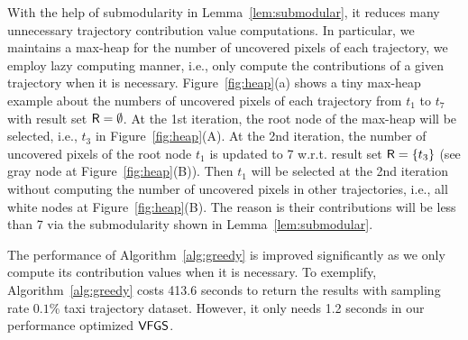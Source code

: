 With the help of submodularity in Lemma~\ref{lem:submodular}, it reduces many unnecessary trajectory contribution value computations.
In particular, we maintains a max-heap for the number of uncovered pixels of each trajectory,
we employ lazy computing manner, i.e., only compute the contributions of a given trajectory when it is necessary.
Figure~\ref{fig:heap}(a) shows a tiny max-heap example about the numbers of uncovered pixels of each trajectory from $t_1$ to $t_7$ with result set $\mathsf{R}=\emptyset$.
At the 1st iteration, the root node of the max-heap will be selected, i.e., $t_3$ in Figure~\ref{fig:heap}(A).
At the 2nd iteration, the number of uncovered pixels of the root node $t_1$ is updated to 7 w.r.t. result set $\mathsf{R} = \{t_3 \}$ (see gray node at Figure~\ref{fig:heap}(B)).
Then $t_1$ will be selected at the 2nd iteration without computing the number of uncovered pixels in other trajectories, i.e., all white nodes at Figure~\ref{fig:heap}(B).
The reason is their contributions will be less than 7 via the submodularity shown in Lemma~\ref{lem:submodular}.


%
%
The performance of Algorithm~\ref{alg:greedy} is improved significantly as we only compute its contribution values when it is necessary.
To exemplify, Algorithm~\ref{alg:greedy} costs 413.6 seconds to return the results with sampling rate $0.1\%$ \pt{} taxi trajectory dataset.
However, it only needs 1.2 seconds in our performance optimized $\mathsf{VFGS}$.



